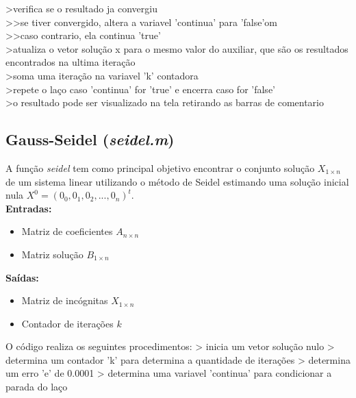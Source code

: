 \documentclass{article}
\begin{document}
              >verifica se o resultado ja convergiu\\
                >>se tiver convergido, altera a variavel 'continua' para 'false'om\\
                >>caso contrario, ela continua 'true'\\

              >atualiza o vetor solução x para o mesmo valor do auxiliar, que são os resultados encontrados na ultima iteração\\

              >soma uma iteração na variavel 'k' contadora\\

              >repete o laço caso 'continua' for 'true' e encerra caso for 'false'\\

            >o resultado pode ser visualizado na tela retirando as barras de comentario %


                \subsection{Gauss-Seidel (\textit{seidel.m})}
                    A função \textit{seidel} tem como principal objetivo encontrar o conjunto solução $X_{1 \times n}$ de um
                    sistema linear utilizando o método de Seidel estimando uma solução inicial nula
                    $X^0 = (0_{0} , 0_{1}, 0_{2},..., 0_{n})^t$.\\

                    \textbf{Entradas:}
                        \begin{itemize}
                          \item Matriz de coeficientes $A_{n \times n}$
                          \item Matriz solução $B_{1 \times n}$
                        \end{itemize}
                    \textbf{Saídas:}
                        \begin{itemize}
                          \item Matriz de incógnitas $X_{1 \times n}$
                          \item Contador de iterações $k$
                        \end{itemize}

                    O código realiza os seguintes procedimentos:
                    > inicia um vetor solução nulo
                    > determina um contador 'k' para determina a quantidade de iterações
                    > determina um erro 'e' de 0.0001
                    > determina uma variavel 'continua' para condicionar a parada do laço
\end{document}
